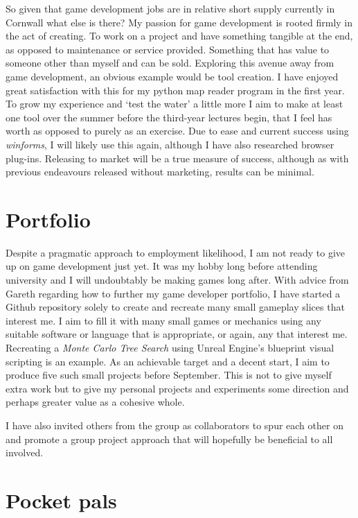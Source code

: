 \documentclass{scrartcl}
\begin{document}
So given that game development jobs are in relative short supply currently in Cornwall what else is there? My passion for game development is rooted firmly in the act of creating. To work on a project and have something tangible at the end, as opposed to maintenance or service provided. Something that has value to someone other than myself and can be sold. Exploring this avenue away from game development, an obvious example would be tool creation. I have enjoyed great satisfaction with this for my python map reader program in the first year. To grow my experience and `test the water' a little more I aim to make at least one tool over the summer before the third-year lectures begin, that I feel has worth as opposed to purely as an exercise. Due to ease and current success using \textit{winforms}, I will likely use this again, although I have also researched browser plug-ins. Releasing to market will be a true measure of success, although as with previous endeavours released without marketing, results can be minimal.

\section*{Portfolio}

Despite a pragmatic approach to employment likelihood, I am not ready to give up on game development just yet. It was my hobby long before attending university and I will undoubtably be making games long after. With advice from Gareth regarding how to further my game developer portfolio, I have started a Github repository solely to create and recreate many small gameplay slices that interest me. I aim to fill it with many small games or mechanics using any suitable software or language that is appropriate, or again, any that interest me. Recreating a \textit{Monte Carlo Tree Search} using Unreal Engine's blueprint visual scripting is an example. As an achievable target and a decent start, I aim to produce five such small projects before September. This is not to give myself extra work but to give my personal projects and experiments some direction and perhaps greater value as a cohesive whole.

I have also invited others from the group as collaborators to spur each other on and promote a group project approach that will hopefully be beneficial to all involved.

\section*{Pocket pals}
\end{document}
